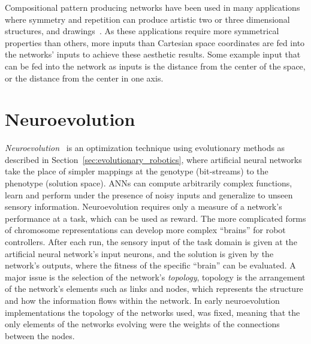 
Compositional pattern producing networks have been used in many applications where symmetry and repetition can produce artistic two or three dimensional structures\footnotemark[2], and drawings\footnotemark[1]~\citep{secretan2008picbreeder}. As these applications require more symmetrical properties than others, more inputs than Cartesian space coordinates are fed into the networks' inputs to achieve these aesthetic results. Some example input that can be fed into the network as inputs is the distance from the center of the space, or the distance from the center in one axis.



\section{Neuroevolution}

\emph{Neuroevolution}~\citep{yao1997new} is an optimization technique using evolutionary methods as described in Section~\ref{sec:evolutionary_robotics}, where artificial neural networks take the place of simpler mappings at the genotype (bit-streams) to the phenotype (solution space). ANNs can compute arbitrarily complex functions, learn and perform under the presence of noisy inputs and generalize to unseen sensory information. Neuroevolution requires only a measure of a network's performance at a task, which can be used as reward. The more complicated forms of chromosome representations can develop more complex ``brains'' for robot controllers. After each run, the sensory input of the task domain is given at the artificial neural network's input neurons, and the solution is given by the network's outputs, where the fitness of the specific ``brain'' can be evaluated. A major issue is the selection of the network's \emph{topology}, topology is the arrangement of the network's elements such as links and nodes, which represents the structure and how the information flows within the network. In early neuroevolution implementations the topology of the networks used, was fixed, meaning that the only elements of the networks evolving were the weights of the connections between the nodes.

